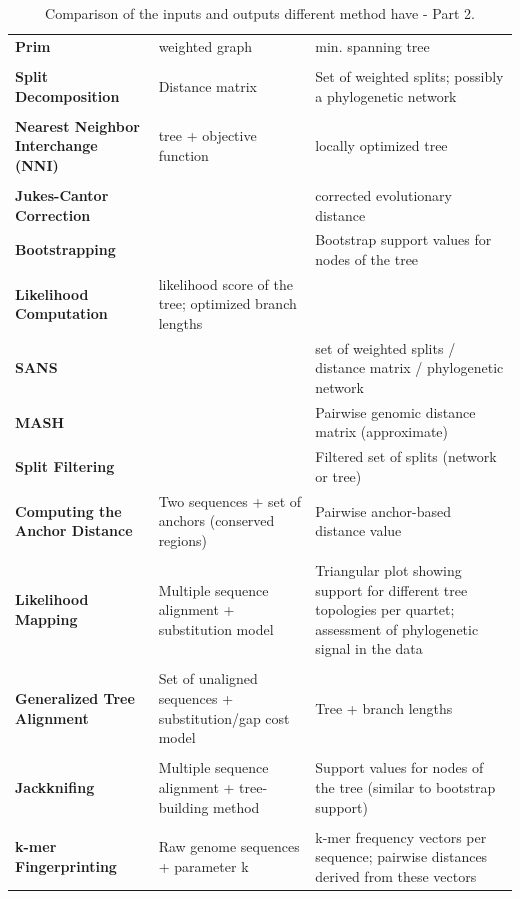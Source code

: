 \begin{table}[H]
 \centering
    \begin{tabular}{p{5cm}p{4cm}p{4cm}}  
      \textbf{Prim} & weighted graph & min. spanning tree\\ \\
        \textbf{Split Decomposition} & Distance matrix &  Set of weighted splits; possibly a phylogenetic network \\ \\
        \textbf{Nearest Neighbor Interchange (NNI)} & tree + objective function & locally optimized tree\\ \\
    \textbf{Jukes-Cantor Correction} & & corrected evolutionary distance \\
    \textbf{Bootstrapping} & & Bootstrap support values for nodes of the tree  \\
    \textbf{Likelihood Computation} & likelihood score of the tree; optimized branch lengths\\
    \textbf{SANS} & & set of weighted splits / distance matrix / phylogenetic network  \\
    \textbf{MASH} & & Pairwise genomic distance matrix (approximate)  \\
    \textbf{Split Filtering} & & Filtered set of splits (network or tree)\\
    \textbf{Computing the Anchor Distance} & Two sequences + set of anchors (conserved regions) & Pairwise anchor-based distance value \\ \\
    \textbf{Likelihood Mapping} &  Multiple sequence alignment + substitution model & Triangular plot showing support for different tree topologies per quartet; assessment of phylogenetic signal in the data  \\ \\
    \textbf{Generalized Tree Alignment} & Set of unaligned sequences + substitution/gap cost model & Tree + branch lengths \\ \\
    \textbf{Jackknifing} & Multiple sequence alignment + tree-building method & Support values for nodes of the tree (similar to bootstrap support) \\ \\
    \textbf{k-mer Fingerprinting} & Raw genome sequences + parameter k & k-mer frequency vectors per sequence; pairwise distances derived from these vectors
     \end{tabular}
      \caption{Comparison of the inputs and outputs different method have - Part 2.}
\end{table}

